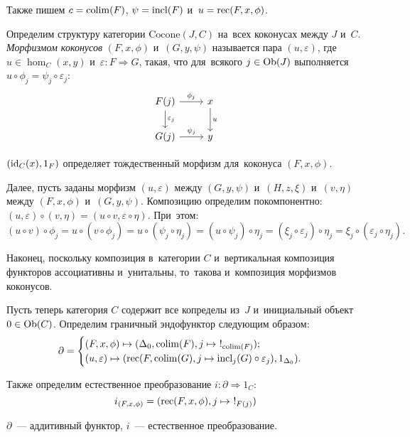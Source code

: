 \documentclass{article}
\begin{document}
Также пишем $c = \mathrm{colim}(F)$, $\psi = \mathrm{incl}(F)$ и~$u = \mathrm{rec}(F, x, \phi)$.

Определим структуру категории $\mathrm{Cocone}(J, C)$ на~всех коконусах между $J$ и~$C$.
\textit{Морфизмом коконусов} $(F, x, \phi)$ и~$(G, y, \psi)$ называется пара $(u, \varepsilon)$,
где $u \in \hom_C(x, y)$ и~$\varepsilon : F \Rightarrow G$, такая, что для~всякого $j \in \mathrm{Ob}(J)$
выполняется $u \circ \phi_j = \psi_j \circ \varepsilon_j$:
\[
    \begin{tikzcd}
        \arrow{d}{\varepsilon_j} F(j) \arrow{r}{\phi_j} & \arrow{d}{u} x \\
                                 G(j) \arrow{r}{\psi_j} &              y
    \end{tikzcd}
\]

$(\mathrm{id}_C(x), 1_F)$ определяет тождественный морфизм для~коконуса $(F, x, \phi)$.

Далее, пусть заданы морфизм $(u, \varepsilon)$ между $(G, y, \psi)$ и~$(H, z, \xi)$ и~$(v, \eta)$ между $(F, x, \phi)$ и~$(G, y, \psi)$.
Композицию определим покомпонентно: $(u, \varepsilon) \circ (v, \eta) = (u \circ v, \varepsilon \circ \eta)$.
При~этом:
$$
    (u \circ v) \circ \phi_j = u \circ (v \circ \phi_j)
                             = u \circ (\psi_j \circ \eta_j)
                             = (u \circ \psi_j) \circ \eta_j
                             = (\xi_j \circ \varepsilon_j) \circ \eta_j
                             = \xi_j \circ (\varepsilon_j \circ \eta_j).
$$

Наконец, поскольку композиция в~категории $C$ и~вертикальная композиция функторов ассоциативны
и~унитальны, то~такова и~композиция морфизмов коконусов.

Пусть теперь категория $C$ содержит все копределы из~$J$ и~инициальный объект $0 \in \mathrm{Ob}(C)$.
Определим граничный эндофунктор следующим образом:
$$
\partial = \begin{cases}
             (F, x, \phi) \mapsto (\Delta_0, \colim(F), j \mapsto\ !_{\colim(F)}); \\
             (u, \varepsilon) \mapsto (\rec(F, \colim(G), j \mapsto \incl_j(G) \circ \varepsilon_j), 1_{\Delta_0}).
           \end{cases}
$$

Также определим естественное преобразование $i : \partial \Rightarrow 1_C$:
$$
    i_{(F, x, \phi)} = (\mathrm{rec}(F, x, \phi), j \mapsto\ !_{F(j)})
$$

\begin{lemma*}
    $\partial$~— аддитивный функтор, $i$~— естественное преобразование.
\end{lemma*}
\end{document}
